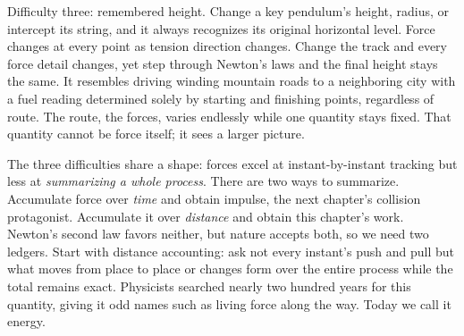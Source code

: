 Difficulty three: remembered height. Change a key pendulum's height, radius, or intercept its string, and it always recognizes its original horizontal level. Force changes at every point as tension direction changes. Change the track and every force detail changes, yet step through Newton's laws and the final height stays the same. It resembles driving winding mountain roads to a neighboring city with a fuel reading determined solely by starting and finishing points, regardless of route. The route, the forces, varies endlessly while one quantity stays fixed. That quantity cannot be force itself; it sees a larger picture.

The three difficulties share a shape: forces excel at instant-by-instant tracking but less at \emph{summarizing a whole process}. There are two ways to summarize. Accumulate force over \emph{time} and obtain impulse, the next chapter's collision protagonist. Accumulate it over \emph{distance} and obtain this chapter's work. Newton's second law favors neither, but nature accepts both, so we need two ledgers. Start with distance accounting: ask not every instant's push and pull but what moves from place to place or changes form over the entire process while the total remains exact. Physicists searched nearly two hundred years for this quantity, giving it odd names such as living force along the way. Today we call it energy.


